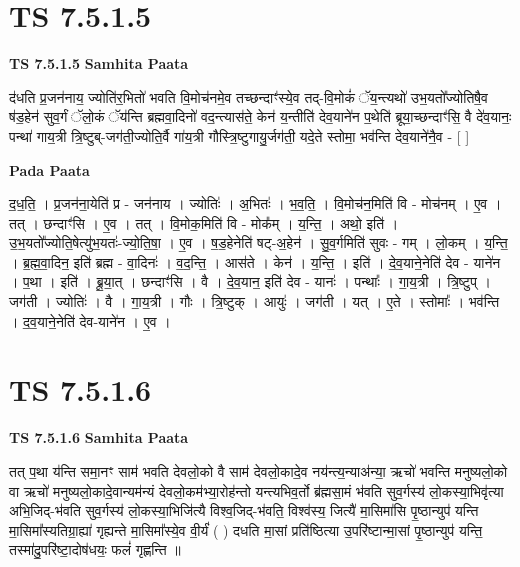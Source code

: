 \documentclass[17pt]{extarticle}
\begin{document}

\section{ TS 7.5.1.5 }

\textbf{TS 7.5.1.5 } \newline
\textbf{Samhita Paata} \newline

द॑धति प्र॒जन॑नाय॒ ज्योति॑र॒भितो॑ भवति वि॒मोच॑नमे॒व तच्छन्दाꣳ॑स्ये॒व तद्-वि॒मोकं॑ ॅय॒न्त्यथो॑ उभ॒यतो᳚ज्योतिषै॒व ष॑ड॒हेन॑ सुव॒र्गं ॅलो॒कं ॅय॑न्ति ब्रह्मवा॒दिनो॑ वद॒न्त्यास॑ते॒ केन॑ य॒न्तीति॑ देव॒याने॑न प॒थेति॑ ब्रूया॒च्छन्दाꣳ॑सि॒ वै दे॑व॒यानः॒ पन्था॑ गाय॒त्री त्रि॒ष्टुब्-जग॑ती॒ज्योति॒र्वै गा॑य॒त्री गौस्त्रि॒ष्टुगायु॒र्जग॑ती॒ यदे॒ते स्तोमा॒ भव॑न्ति देव॒याने॑नै॒व - [  ] \newline

\textbf{Pada Paata} \newline

द॒ध॒ति॒ । प्र॒जन॑ना॒येति॑ प्र - जन॑नाय । ज्योतिः॑ । अ॒भितः॑ । भ॒व॒ति॒ । वि॒मोच॑न॒मिति॑ वि - मोच॑नम् । ए॒व । तत् । छन्दाꣳ॑सि । ए॒व । तत् । वि॒मोक॒मिति॑ वि - मोक᳚म् । य॒न्ति॒ । अथो॒ इति॑ । उ॒भ॒यतो᳚ज्योति॒षेत्यु॑भ॒यतः॑-ज्यो॒ति॒षा॒ । ए॒व । ष॒ड॒हेनेति॑ षट्-अ॒हेन॑ । सु॒व॒र्गमिति॑ सुवः - गम् । लो॒कम् । य॒न्ति॒ । ब्र॒ह्म॒वा॒दिन॒ इति॑ ब्रह्म - वा॒दिनः॑ । व॒द॒न्ति॒ । आस॑ते । केन॑ । य॒न्ति॒ । इति॑ । दे॒व॒याने॒नेति॑ देव - याने॑न । प॒था । इति॑ । ब्रू॒या॒त् । छन्दाꣳ॑सि । वै । दे॒व॒यान॒ इति॑ देव - यानः॑ । पन्थाः᳚ । गा॒य॒त्री । त्रि॒ष्टुप् । जग॑ती । ज्योतिः॑ । वै । गा॒य॒त्री । गौः । त्रि॒ष्टुक् । आयुः॑ । जग॑ती । यत् । ए॒ते । स्तोमाः᳚ । भव॑न्ति । द॒व॒याने॒नेति॑ देव-याने॑न । ए॒व ।  \newline





\section{ TS 7.5.1.6 }

\textbf{TS 7.5.1.6 } \newline
\textbf{Samhita Paata} \newline

तत् प॒था य॑न्ति समा॒नꣳ साम॑ भवति देवलो॒को वै साम॑ देवलो॒कादे॒व नय॑न्त्य॒न्याअ॑न्या॒ ऋचो॑ भवन्ति मनुष्यलो॒को वा ऋचो॑ मनुष्यलो॒कादे॒वान्यम॑न्यं देवलो॒कम॑भ्या॒रोह॑न्तो यन्त्यभिव॒र्तो ब्र॑ह्मसा॒मं भ॑वति सुव॒र्गस्य॑ लो॒कस्या॒भिवृ॑त्या अभि॒जिद्-भ॑वति सुव॒र्गस्य॑ लो॒कस्या॒भिजि॑त्यै विश्व॒जिद्-भ॑वति॒ विश्व॑स्य॒ जित्यै॑ मा॒सिमा॑सि पृ॒ष्ठान्युप॑ यन्ति मा॒सिमा᳚स्यतिग्रा॒ह्या॑ गृह्यन्ते मा॒सिमा᳚स्ये॒व वी॒र्यं॑ ( ) दधति मा॒सां प्रति॑ष्ठित्या उ॒परि॑ष्टान्मा॒सां पृ॒ष्ठान्युप॑ यन्ति॒ तस्मा॑दु॒परि॑ष्टा॒दोष॑धयः॒ फलं॑ गृह्णन्ति ॥ \newline
\end{document}
